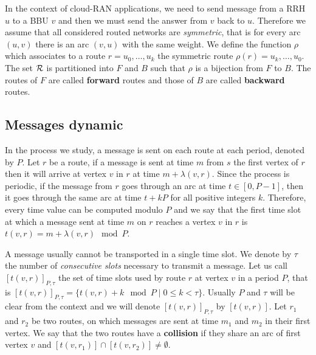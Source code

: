 \documentclass[10pt, conference, letterpaper]{IEEEtran}
\begin{document}
   In the context of cloud-RAN applications, we need to send message from a RRH $u$ to a BBU $v$ and then 
      we must send the answer from $v$ back to $u$. Therefore we assume that all considered routed networks 
      are \emph{symmetric}, that is for every arc $(u,v)$ there is an arc $(v,u)$ with the same weight.
      We define the function $\rho$ which associates to a route $r = u_0,\dots,u_k$ the symmetric route $\rho(r) = u_k,\dots,u_0$.
      The set ${\cal R}$ is partitioned into $F$ and $B$ such that $\rho$ is a bijection from $F$ to $B$.
      The routes of $F$ are called \textbf{forward} routes and those of $B$ are called \textbf{backward} routes.
%       
      


   \subsection{Messages dynamic}
      
      
      In the process we study, a message is sent on each route at each period, denoted by $P$.
      Let $r$ be a route, if a message is sent at time $m$ from $s$ the first vertex of $r$ then it will arrive at vertex $v$ in $r$ at time $m + \lambda(v,r)$. Since the process is periodic, if the message from $r$ goes through an arc at time $t\in [0,P-1]$, 
      then it goes through the same arc at time $t+kP$ for all positive integers $k$. Therefore, every time value can be computed modulo $P$ and we say that the first time slot at which a message sent at time $m$ on $r$ reaches a vertex $v$ in $r$ is $t(v,r) = m + \lambda(v,r) \mod P$. 
      
      A message usually cannot be transported in a single time slot. We denote by $\tau$ the number 
      of \emph{consecutive slots} necessary to transmit a message. Let us call $[t(v,r)]_{P,\tau}$ the set of time slots used by route $r$ at vertex $v$ in a period $P$, that is $[t(v,r)]_{P,\tau} = \{t(v,r) + k \mod P \mid 0 \leq k < \tau \}$. Usually $P$ and $\tau$ will be clear from the context and we will denote $[t(v,r)]_{P,\tau}$ by $[t(v,r)]$.
      Let $r_1$ and $r_2$ be two routes, on which messages are sent at time $m_1$ and $m_2$ in their first vertex.
      We say that the two routes have a {\bf collision} if they share an arc of first vertex $v$ and $[t(v,r_{1})] \cap [t(v,r_{2})] \neq \emptyset$.
      
\end{document}
